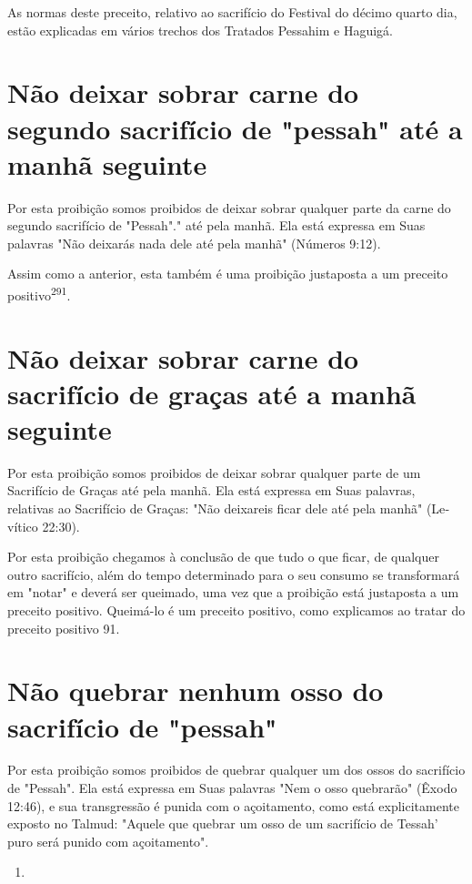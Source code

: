 \begin{itemize}
\begin{enumrate}
\begin{itemize}
\begin{itemize}
\begin{itemize}
As normas deste preceito, relativo ao sacrifício do Festival do déci­mo
quarto dia, estão explicadas em vários trechos dos Tratados Pessahim e
Haguigá.

\section{Não deixar sobrar carne do segundo sacrifício de "pessah" até a manhã seguinte}


Por esta proibição somos proibidos de deixar sobrar qualquer parte da
carne do segundo sacrifício de "Pessah"." até pela
manhã. Ela está expressa em Suas palavras "Não deixarás nada dele até
pela manhã" (Números 9:12).

Assim como a anterior, esta também é uma proibição justaposta a um
preceito positivo\textsuperscript{291}.

\section{Não deixar sobrar carne do sacrifício de graças até a manhã seguinte}

Por esta proibição somos proibidos de deixar sobrar qualquer parte de um
Sacrifício de Graças até pela manhã. Ela está expressa em Suas palavras,
relativas ao Sacrifício de Graças: "Não deixareis ficar dele até pela
manhã" (Le­vítico 22:30).

Por esta proibição chegamos à conclusão de que tudo o que ficar, de
qualquer outro sacrifício, além do tempo determinado para o seu consumo
se transformará em "notar" e deverá ser queimado, uma vez que a
proibição está justaposta a um preceito positivo. Queimá-lo é um
preceito positivo, co­mo explicamos ao tratar do preceito positivo 91.

\section{Não quebrar nenhum osso do sacrifício de "pessah"}

Por esta proibição somos proibidos de quebrar qualquer um dos os­sos do
sacrifício de "Pessah". Ela está expressa em Suas palavras "Nem o osso
quebrarão" (Êxodo 12:46), e sua transgressão é punida com o açoitamento,
co­mo está explicitamente exposto no Talmud: "Aquele que quebrar um osso
de um sacrifício de Tessah' puro será punido com açoitamento".


\begin{enumerate}
\def\labelenumi{\arabic{enumi}.}
\setcounter{enumi}{289}
\item
 

\end{enumerate}
\end{itemize}
\end{itemize}
\end{itemize}
\end{enumrate}
\end{itemize}
